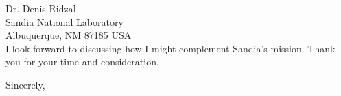 \documentclass[letterpaper,12pt]{letter}
\begin{document}
\begin{letter}{
Dr. Denis Ridzal\\
Sandia National Laboratory\\
Albuquerque, NM 87185 USA\\
}
I look forward to discussing how I might complement Sandia's mission.
Thank you for your time and consideration. 

 
 
 
\closing{Sincerely,} 
 

 

\end{letter}
 
\end{document}

